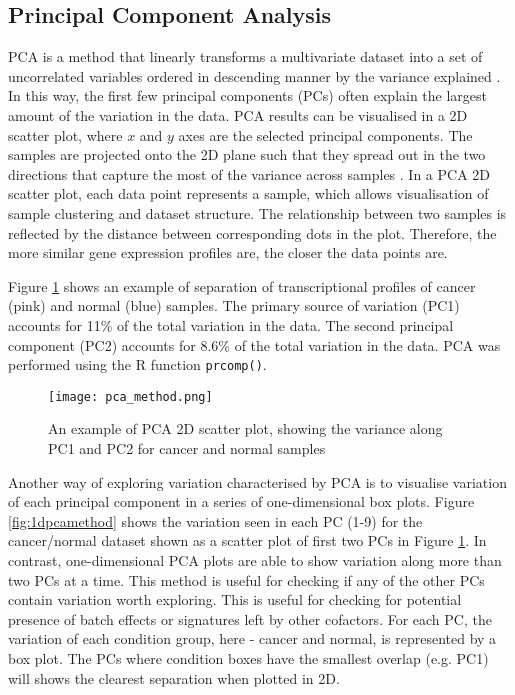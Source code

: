     \subsection{Principal Component Analysis}
    
    PCA is a method that linearly transforms a multivariate dataset into a set of uncorrelated variables ordered in descending manner by the variance explained \cite{jolliffe2002principal}. In this way, the first few principal components (PCs) often explain the largest amount of the variation in the data. PCA results can be visualised in a 2D scatter plot, where $x$ and $y$ axes are the selected principal components. The samples are projected onto the 2D plane such that they spread out in the two directions that capture the most of the variance across samples \cite{Love2016RNA-SeqApproved}. 
    In a PCA 2D scatter plot, each data point represents a sample, which allows visualisation of sample clustering and dataset structure.  The relationship between two samples is reflected by the distance between corresponding dots in the plot. Therefore, the more similar gene expression profiles are, the closer the data points are.    
   
    Figure \ref{fig:pcamethod} shows an example of separation of transcriptional profiles of cancer (pink) and normal (blue) samples. The primary source of variation (PC1) accounts for 11\% of the total variation in the data. The second principal component (PC2) accounts for 8.6\% of the total variation in the data. PCA was performed using the R function \texttt{prcomp()}.
    
            \begin{figure}[h]
            \centering
            \texttt{[image: pca\_method.png]}
            \caption{An example of PCA 2D scatter plot, showing the variance along PC1 and PC2 for cancer and normal samples}
            \label{fig:pcamethod}
            \end{figure}
        
    \newpage
    Another way of exploring variation characterised by PCA is to visualise variation of each principal component in a series of one-dimensional box plots. Figure \ref{fig:1dpcamethod} shows the variation seen in each PC (1-9) for the cancer/normal dataset shown as a scatter plot of first two PCs in Figure \ref{fig:pcamethod}. 
    In contrast, one-dimensional PCA plots are able to show variation along more than two PCs at a time. This method is useful for checking if any of the other PCs contain variation worth exploring. This is useful for checking for potential presence of batch effects or signatures left by other cofactors. 
    For each PC, the variation of each condition group, here - cancer and normal, is represented by a box plot. The PCs where condition boxes have the smallest overlap (e.g. PC1) will shows the clearest separation when plotted in 2D. 
       
